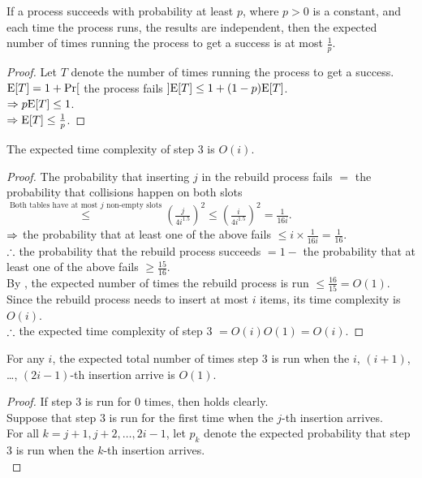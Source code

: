 \begin{pr}
\begin{lm}\label{4a}
If a process succeeds with probability at least $p$, where $p>0$ is a constant, and each time the process runs, the results are independent, then the expected number of times running the process to get a success is at most $\frac1p$.
\begin{proof}
Let $T$ denote the number of times running the process to get a success.\\
$\mathrm{E}[T]=1+\mathrm{Pr}[$ the process fails $]\mathrm{E}[T]\leq1+(1-p)\mathrm{E}[T]$.\\
$\Rightarrow p\mathrm{E}[T]\leq1$.\\
$\Rightarrow\mathrm{E}[T]\leq\frac1p$.
\end{proof}
\end{lm}
\begin{lm}\label{4b}
The expected time complexity of step 3 is $O(i)$.
\begin{proof}
The probability that inserting $j$ in the rebuild process fails $=$ the probability that collisions happen on both slots $\overset{\text{Both tables have at most }j\text{ non-empty slots}}\leq(\frac j{4i^{1.5}})^2\leq(\frac i{4i^{1.5}})^2=\frac1{16i}$.\\
$\Rightarrow$ the probability that at least one of the above fails $\leq i\times\frac1{16i}=\frac1{16}$.\\
$\therefore$ the probability that the rebuild process succeeds $=1-$ the probability that at least one of the above fails $\geq\frac{15}{16}$.\\
By , the expected number of times the rebuild process is run $\leq\frac{16}{15}=O(1)$.\\
Since the rebuild process needs to insert at most $i$ items, its time complexity is $O(i)$.\\
$\therefore$ the expected time complexity of step 3 $=O(i)O(1)=O(i)$.
\end{proof}
\end{lm}
\begin{lm}\label{4c}
For any $i$, the expected total number of times step 3 is run when the $i$, $(i+1)$, \dots, $(2i-1)$-th insertion arrive is $O(1)$.
\begin{proof}
If step 3 is run for $0$ times, then  holds clearly.\\
Suppose that step 3 is run for the first time when the $j$-th insertion arrives.\\
For all $k=j+1, j+2, \dots, 2i-1$, let $p_k$ denote the expected probability that step 3 is run when the $k$-th insertion arrives.\\

\end{proof}
\end{lm}
\end{pr}
